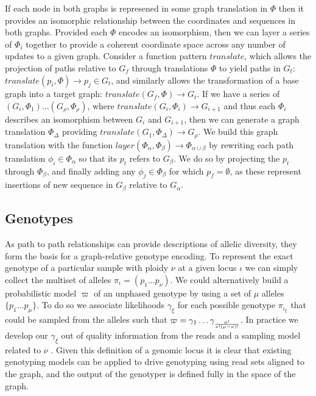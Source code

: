 If each node in both graphs is represened in some graph translation in $\Phi$ then it provides an isomorphic relationship between the coordinates and sequences in both graphs.
Provided each $\Phi$ encodes an isomorphism, then we can layer a series of $\Phi_i$ together to provide a coherent coordinate space across any number of updates to a given graph.
Consider a function pattern $translate$, which allows the projection of paths relative to $G_f$ through translations $\Phi$ to yield paths in $G_t$: $translate(p_i, \Phi) \to p_j \in G_t$, and similarly allows the transformation of a base graph into a target graph: $translate(G_f, \Phi) \to G_t$.
If we have a series of $(G_i, \Phi_1) \ldots (G_\rho, \Phi_\rho)$, where $translate(G_i, \Phi_i) \to G_{i+1}$ and thus each $\Phi_i$ describes an isomorphism between $G_i$ and $G_{i+1}$, then we can generate a graph translation $\Phi_\Delta$ providing $translate(G_1, \Phi_\Delta) \to G_\rho$.
We build this graph translation with the function $layer(\Phi_\alpha, \Phi_\beta) \to \Phi_{\alpha \cup \beta}$ by rewriting each path translation $\phi_i \in \Phi_\alpha$ so that its $p_t$ refers to $G_\beta$.
We do so by projecting the $p_t$ through $\Phi_\beta$, and finally adding any $\phi_j \in \Phi_\beta$ for which $p_f = \emptyset$, as these represent insertions of new sequence in $G_\beta$ relative to $G_\alpha$.

\subsection{Genotypes}
\label{sec:genotypes}

As path to path relationships can provide descriptions of allelic diversity, they form the basis for a graph-relative genotype encoding.
To represent the exact genotype of a particular sample with ploidy $\nu$ at a given locus $\iota$ we can simply collect the multiset of alleles $\pi_\iota = ( p_1 \ldots p_\nu)$.
We could alternatively build a probabilistic model $\varpi$ of an unphased genotype by using a set of $\mu$ alleles $\{ p_1 \ldots p_\mu\}$.
To do so we associate likelihoods $\gamma_\xi$ for each possible genotype $\pi_{\iota_\xi}$ that could be sampled from the alleles such that $\varpi = \gamma_1 \ldots \gamma_{\mu! \over{\nu!(\mu-\nu)!} }$.
In practice we develop our $\gamma_\xi$ out of quality information from the reads and a sampling model related to $\nu$ \cite{garrison2012haplotype,li2011stats}.
Given this definition of a genomic locus it is clear that existing genotyping models can be applied to drive genotyping using read sets aligned to the graph, and the output of the genotyper is defined fully in the space of the graph.

